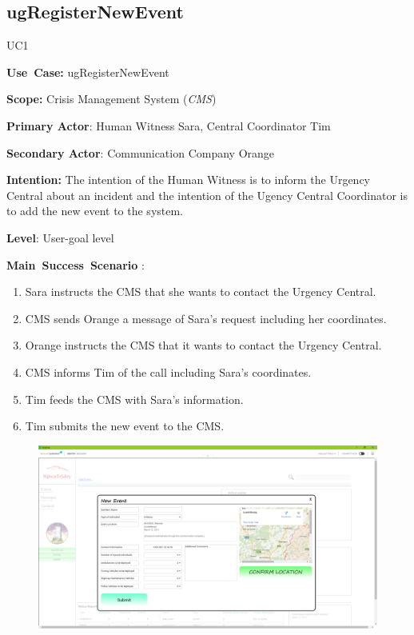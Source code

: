 \subsection{ugRegisterNewEvent}
\begin{lyxlist}{UC1}
\small{
\item [\textbf{Use~Case:}] ugRegisterNewEvent
\item [\textbf{Scope:}] Crisis Management System (\emph{CMS})
\item [\textbf{Primary Actor}:] Human Witness Sara, Central Coordinator Tim
\item [\textbf{Secondary Actor}:] Communication Company Orange
\item [\textbf{Intention:}]The intention of the Human Witness is to inform the
Urgency Central about an incident and the intention of the Ugency Central Coordinator is
to add the new event to the system.
\item [\textbf{Level}:]User-goal level
\item [\textbf{Main~Success~Scenario}]:
\begin{enumerate}
\item Sara instructs the CMS that she wants to contact the Urgency
Central.
\item CMS sends Orange a message of Sara's request including her coordinates.
\item Orange instructs the CMS that it wants to contact the Urgency Central.
\item CMS informs Tim of the call including Sara's coordinates.
\item Tim feeds the CMS with Sara's information.
\item Tim submits the new event to the CMS.
\end{enumerate}
}

\begin{figure}[!ht]
\centering
\includegraphics[scale=0.3]{AddNewEventScreenShot.eps}
\end{figure}

\end{lyxlist}

